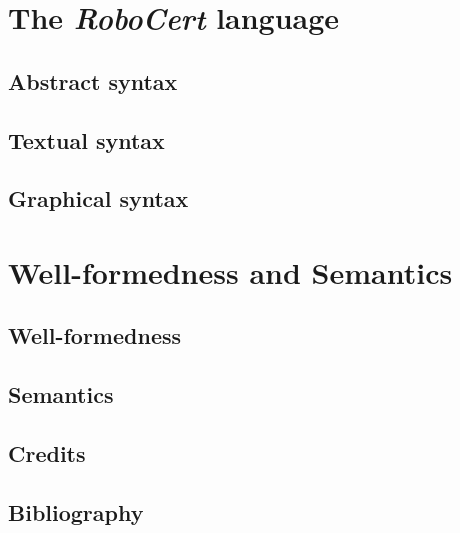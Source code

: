 \documentclass[11pt]{book}
\newcommand{\langname}{{\sffamily\itshape RoboCert}}
\begin{document}
\mainmatter

\part{The \langname{} language}

\chapter{Abstract syntax}\label{cha:metamodel}


\chapter{Textual syntax}\label{cha:textual}


\chapter{Graphical syntax}\label{cha:graphical}


\part{Well-formedness and Semantics}

\chapter{Well-formedness}\label{cha:wf}


\chapter{Semantics}\label{cha:semantics}


\appendix

\stopcontents

\chapter*{Credits}\label{cha:credits}


\chapter*{Bibliography}
\printbibliography[heading=bibempty]
\end{document}
